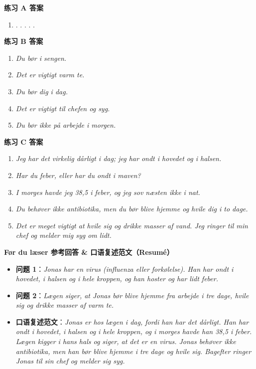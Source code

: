 \begin{answerbox}
\textbf{练习 A 答案}
\begin{enumerate}
  \item {} .  .  .  .  . 
\end{enumerate}

\textbf{练习 B 答案}
\begin{enumerate}
  \item \textit{Du bør  i sengen.}
  \item \textit{Det er vigtigt  varm te.}
  \item \textit{Du bør  dig i dag.}
  \item \textit{Det er vigtigt  til chefen og  syg.}
  \item \textit{Du bør ikke  på arbejde i morgen.}
\end{enumerate}

\textbf{练习 C 答案}
\begin{enumerate}
  \item \textit{Jeg har det virkelig dårligt i dag; jeg har ondt i hovedet og i halsen.}
  \item \textit{Har du feber, eller har du ondt i maven?}
  \item \textit{I morges havde jeg 38,5 i feber, og jeg sov næsten ikke i nat.}
  \item \textit{Du behøver ikke antibiotika, men du bør blive hjemme og hvile dig i to dage.}
  \item \textit{Det er meget vigtigt at hvile sig og drikke masser af vand. Jeg ringer til min chef og melder mig syg om lidt.}
\end{enumerate}

\textbf{Før du læser 参考回答 \& 口语复述范文（Resumé）}
\begin{itemize}
  \item \textbf{问题 1}：\textit{Jonas har en virus (influenza eller forkølelse). Han har ondt i hovedet, i halsen og i hele kroppen, og han hoster og har lidt feber.}
  \item \textbf{问题 2}：\textit{Lægen siger, at Jonas bør blive hjemme fra arbejde i tre dage, hvile sig og drikke masser af varm te.}
  \item \textbf{口语复述范文}：\textit{Jonas er hos lægen i dag, fordi han har det dårligt. Han har ondt i hovedet, i halsen og i hele kroppen, og i morges havde han 38,5 i feber. Lægen kigger i hans hals og siger, at det er en virus. Jonas behøver ikke antibiotika, men han bør blive hjemme i tre dage og hvile sig. Bagefter ringer Jonas til sin chef og melder sig syg.}
\end{itemize}
\end{answerbox}
